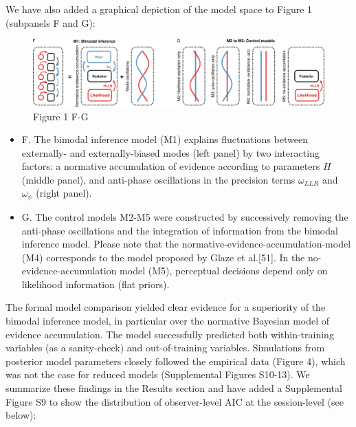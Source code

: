 \documentclass[
]{article}
\begin{document}
We have also added a graphical depiction of the model space to Figure 1
(subpanels F and G):

\begin{figure}
\centering
\includegraphics{./Material/added_Figure_1.png}
\caption{Figure 1 F-G}
\end{figure}

\begin{itemize}
\item
  F. The bimodal inference model (M1) explains fluctuations between
  externally- and externally-biased modes (left panel) by two
  interacting factors: a normative accumulation of evidence according to
  parameters \(H\) (middle panel), and anti-phase oscillations in the
  precision terms \(\omega_{LLR}\) and \(\omega_{\psi}\) (right panel).
\item
  G. The control models M2-M5 were constructed by successively removing
  the anti-phase oscillations and the integration of information from
  the bimodal inference model. Please note that the
  normative-evidence-accumulation-model (M4) corresponds to the model
  proposed by Glaze et al.{[}51{]}. In the no-evidence-accumulation
  model (M5), perceptual decisions depend only on likelihood information
  (flat priors).
\end{itemize}

The formal model comparison yielded clear evidence for a superiority of
the bimodal inference model, in particular over the normative Bayesian
model of evidence accumulation. The model successfully predicted both
within-training variables (as a sanity-check) and out-of-training
variables. Simulations from posterior model parameters closely followed
the empirical data (Figure 4), which was not the case for reduced models
(Supplemental Figures S10-13). We summarize these findings in the
Results section and have added a Supplemental Figure S9 to show the
distribution of observer-level AIC at the session-level (see below):
\end{document}
